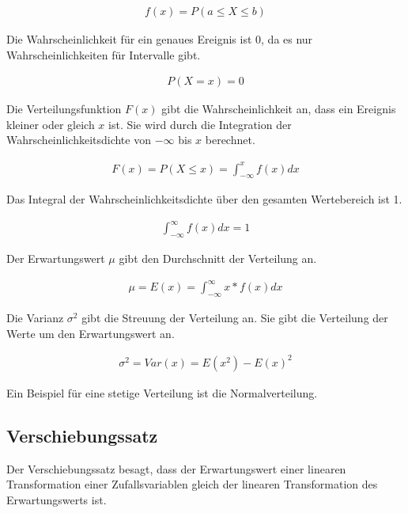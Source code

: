 \documentclass[12pt]{scrartcl}
\begin{document}
\begin{align*}
    f(x) = P(a \leq X \leq b)
\end{align*}

Die Wahrscheinlichkeit für ein genaues Ereignis ist 0, da es nur Wahrscheinlichkeiten für Intervalle gibt.\par

\begin{align*}
    P(X=x) = 0
\end{align*}

Die Verteilungsfunktion $F(x)$ gibt die Wahrscheinlichkeit an, dass ein Ereignis kleiner oder gleich $x$ ist.
Sie wird durch die Integration der Wahrscheinlichkeitsdichte von $-\infty$ bis $x$ berechnet.\par

\begin{align*}
    F(x) = P(X \leq x) = \int_{-\infty}^{x} f(x) dx
\end{align*}

Das Integral der Wahrscheinlichkeitsdichte über den gesamten Wertebereich ist 1.\par

\begin{align*}
    \int_{-\infty}^{\infty} f(x) dx = 1
\end{align*}

Der Erwartungswert $\mu$ gibt den Durchschnitt der Verteilung an.\par

\begin{align*}
    \mu = E(x) = \int_{-\infty}^{\infty} x * f(x) dx
\end{align*}

Die Varianz $\sigma^2$ gibt die Streuung der Verteilung an.
Sie gibt die Verteilung der Werte um den Erwartungswert an.
\par

\begin{align*}
    \sigma^2 = Var(x) = E(x^2) - E(x)^2
\end{align*}

Ein Beispiel für eine stetige Verteilung ist die Normalverteilung.

\subsection{Verschiebungssatz}

Der Verschiebungssatz besagt, dass der Erwartungswert einer linearen Transformation einer Zufallsvariablen gleich der linearen Transformation des Erwartungswerts ist.\par
\end{document}
